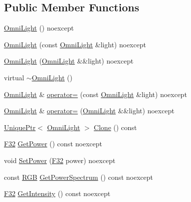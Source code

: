 \subsection*{Public Member Functions}
\begin{DoxyCompactItemize}
\item 
\hyperlink{classmage_1_1_omni_light_a7e415936a810268d874f198aa2a9e5d9}{Omni\+Light} () noexcept
\item 
\hyperlink{classmage_1_1_omni_light_ac52de90bfbdc72d50b1f258f734b5fc9}{Omni\+Light} (const \hyperlink{classmage_1_1_omni_light}{Omni\+Light} \&light) noexcept
\item 
\hyperlink{classmage_1_1_omni_light_a541a41f6173c94833def1f30fa90fd6f}{Omni\+Light} (\hyperlink{classmage_1_1_omni_light}{Omni\+Light} \&\&light) noexcept
\item 
virtual \hyperlink{classmage_1_1_omni_light_af6f4921499b430041966f38aac920b69}{$\sim$\+Omni\+Light} ()
\item 
\hyperlink{classmage_1_1_omni_light}{Omni\+Light} \& \hyperlink{classmage_1_1_omni_light_a4c88b169df94819f394967f2e3ebf2f3}{operator=} (const \hyperlink{classmage_1_1_omni_light}{Omni\+Light} \&light) noexcept
\item 
\hyperlink{classmage_1_1_omni_light}{Omni\+Light} \& \hyperlink{classmage_1_1_omni_light_a92225bb01b879ec38f193d7abbc0543e}{operator=} (\hyperlink{classmage_1_1_omni_light}{Omni\+Light} \&\&light) noexcept
\item 
\hyperlink{namespacemage_a3316d7143a973e37adf1110f2e80ca31}{Unique\+Ptr}$<$ \hyperlink{classmage_1_1_omni_light}{Omni\+Light} $>$ \hyperlink{classmage_1_1_omni_light_a82325924de65733314dcf2b87e926d60}{Clone} () const
\item 
\hyperlink{namespacemage_aa97e833b45f06d60a0a9c4fc22ae02c0}{F32} \hyperlink{classmage_1_1_omni_light_a13f9893ef0a19cbb08bfce557bb906fc}{Get\+Power} () const noexcept
\item 
void \hyperlink{classmage_1_1_omni_light_a03f277ecf566147aa54c95816871de10}{Set\+Power} (\hyperlink{namespacemage_aa97e833b45f06d60a0a9c4fc22ae02c0}{F32} power) noexcept
\item 
const \hyperlink{structmage_1_1_r_g_b}{R\+GB} \hyperlink{classmage_1_1_omni_light_a17a0de3d22bfd3dcb2480f516009d885}{Get\+Power\+Spectrum} () const noexcept
\item 
\hyperlink{namespacemage_aa97e833b45f06d60a0a9c4fc22ae02c0}{F32} \hyperlink{classmage_1_1_omni_light_ae7309fdbe54b5d6bc6d4e20990ba6bdc}{Get\+Intensity} () const noexcept
\item 

\end{DoxyCompactItemize}
